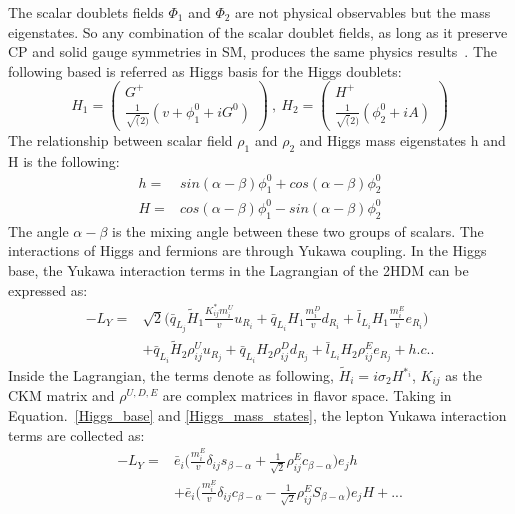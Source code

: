 The scalar doublets fields $\Phi_{1}$ and $\Phi_{2}$ are not physical observables but the mass eigenstates. So any combination of the scalar doublet fields, as long as it preserve CP and solid gauge symmetries in SM, produces the same physics results~\cite{BRANCO20121}. The following based is referred as Higgs basis for the Higgs doublets:
\begin{equation}\label{Higgs_base}
H_{1}=
\begin{pmatrix}
G^{+}    \\
\frac{1}{\sqrt(2)}(v+\phi^{0}_{1}+iG^{0})
\end{pmatrix}~,~
H_{2}=
\begin{pmatrix}
H^{+}    \\
\frac{1}{\sqrt(2)}(\phi^{0}_{2}+iA)
\end{pmatrix}
\end{equation}
The relationship between scalar field $\rho_{1}$ and $\rho_{2}$ and Higgs mass eigenstates h and H is the following:
\begin{equation}\label{Higgs_mass_states}
\begin{aligned}
h=&sin(\alpha-\beta)\phi_{1}^{0}+cos(\alpha-\beta)\phi_{2}^{0}\\
H=&cos(\alpha-\beta)\phi_{1}^{0}-sin(\alpha-\beta)\phi_{2}^{0}
\end{aligned}
\end{equation}
The angle $\alpha-\beta$ is the mixing angle between these two groups of scalars. The interactions of Higgs and fermions are through Yukawa coupling. In the Higgs base, the Yukawa interaction terms in the Lagrangian of the 2HDM can be expressed as:
\begin{equation}
\begin{aligned}
-L_{Y}=&\sqrt{2}\big(\bar{q}_{L_{j}}\tilde{H}_{1}\frac{K^{\ast}_{ij}m^{U}_{i}}{v}u_{R_{i}}+\bar{q}_{L_{i}}H_{1}\frac{m^{D}_{i}}{v}d_{R_{i}}+\bar{l}_{L_{i}}H_{1}\frac{m^{E}_{i}}{v}e_{R_{i}}\big) \\
            &+\bar{q}_{L_{i}}\tilde{H}_{2}\rho^{U}_{ij}u_{R_{j}}+\bar{q}_{L_{i}}H_{2}\rho^{D}_{ij}d_{R_{j}}+\bar{l}_{L_{i}}H_{2}\rho^{E}_{ij}e_{R_{j}}+h.c..
\end{aligned}
\end{equation}
Inside the Lagrangian, the terms denote as following, $\tilde{H}_i=i\sigma_{2}H^{\ast_{i}}$,  $K_{ij}$ as the CKM matrix and $\rho^{U,D,E}$ are complex matrices in flavor space. Taking in Equation.~\ref{Higgs_base} and \ref{Higgs_mass_states}, the lepton Yukawa interaction terms are collected as:
\begin{equation}
\begin{aligned}
-L_{Y}=&\bar{e}_{i}\big(\frac{m^{E}_{i}}{v}\delta_{ij}s_{\beta-\alpha}+\frac{1}{\sqrt{2}}\rho^{E}_{ij}c_{\beta-\alpha}\big)e_{j}h\\
            &+\bar{e}_{i}\big(\frac{m^{E}_{i}}{v}\delta_{ij}c_{\beta-\alpha}-\frac{1}{\sqrt{2}}\rho^{E}_{ij}S_{\beta-\alpha}\big)e_{j}H+...
\end{aligned}
\end{equation}
